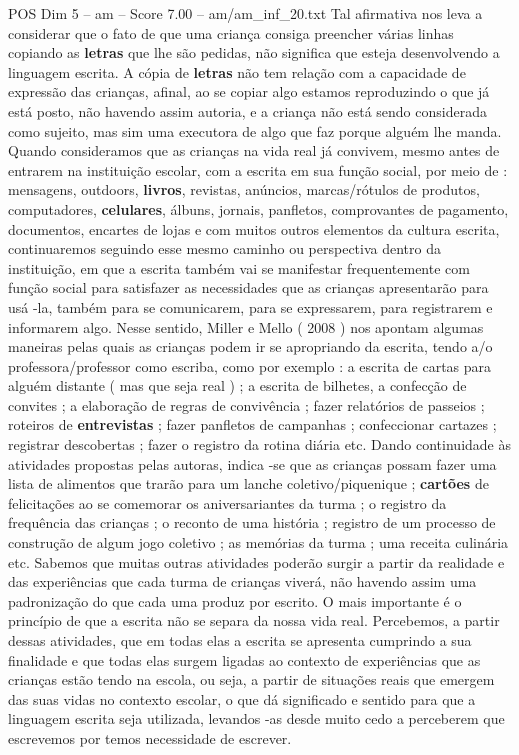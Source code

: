 \begin{textsample}{POS Dim 5 – am – Score 7.00 – am/am\_inf\_20.txt}
Tal afirmativa nos leva a considerar que o fato de que uma criança consiga preencher várias linhas copiando as \textbf{letras} que lhe são pedidas, não significa que esteja desenvolvendo a linguagem escrita.
A cópia de \textbf{letras} não tem relação com a capacidade de expressão das crianças, afinal, ao se copiar algo estamos reproduzindo o que já está posto, não havendo assim autoria, e a criança não está sendo considerada como sujeito, mas sim uma executora de algo que faz porque alguém lhe manda.
Quando consideramos que as crianças na vida real já convivem, mesmo antes de entrarem na instituição escolar, com a escrita em sua função social, por meio de : mensagens, outdoors, \textbf{livros}, revistas, anúncios, marcas/rótulos de produtos, computadores, \textbf{celulares}, álbuns, jornais, panfletos, comprovantes de pagamento, documentos, encartes de lojas e com muitos outros elementos da cultura escrita, continuaremos seguindo esse mesmo caminho ou perspectiva dentro da instituição, em que a escrita também vai se manifestar frequentemente com função social para satisfazer as necessidades que as crianças apresentarão para usá -la, também para se comunicarem, para se expressarem, para registrarem e informarem algo.
Nesse sentido, Miller e Mello ( 2008 ) nos apontam algumas maneiras pelas quais as crianças podem ir se apropriando da escrita, tendo a/o professora/professor como escriba, como por exemplo : a escrita de cartas para alguém distante ( mas que seja real ) ; a escrita de bilhetes, a confecção de convites ; a elaboração de regras de convivência ; fazer relatórios de passeios ; roteiros de \textbf{entrevistas} ; fazer panfletos de campanhas ; confeccionar cartazes ; registrar descobertas ; fazer o registro da rotina diária etc.
Dando continuidade às atividades propostas pelas autoras, indica -se que as crianças possam fazer uma lista de alimentos que trarão para um lanche coletivo/piquenique ; \textbf{cartões} de felicitações ao se comemorar os aniversariantes da turma ; o registro da frequência das crianças ; o reconto de uma história ; registro de um processo de construção de algum jogo coletivo ; as memórias da turma ; uma receita culinária etc.
Sabemos que muitas outras atividades poderão surgir a partir da realidade e das experiências que cada turma de crianças viverá, não havendo assim uma padronização do que cada uma produz por escrito.
O mais importante é o princípio de que a escrita não se separa da nossa vida real.
Percebemos, a partir dessas atividades, que em todas elas a escrita se apresenta cumprindo a sua finalidade e que todas elas surgem ligadas ao contexto de experiências que as crianças estão tendo na escola, ou seja, a partir de situações reais que emergem das suas vidas no contexto escolar, o que dá significado e sentido para que a linguagem escrita seja utilizada, levandos -as desde muito cedo a perceberem que escrevemos por temos necessidade de escrever.

\end{textsample}
